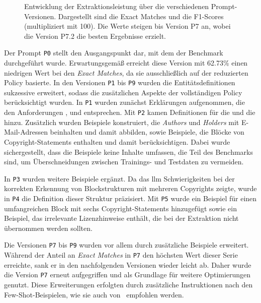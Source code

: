 \begin{figure}[ht]
    \centering
    \caption{Entwicklung der Extraktionsleistung über die verschiedenen Prompt-Versionen. Dargestellt sind die Exact Matches und die F1-Scores (multipliziert mit 100). Die Werte steigen bis Version P7 an, wobei die Version P7.2 die besten Ergebnisse erzielt.}
    \label{fig:prompt-engineering-results}
\end{figure}

Der Prompt \texttt{P0} stellt den Ausgangspunkt dar, mit dem der Benchmark durchgeführt wurde.
Erwartungsgemäß erreicht diese Version mit \num{62.73}\% einen niedrigen Wert bei den \textit{Exact Matches}, da sie ausschließlich auf der reduzierten Policy basierte.
In den Versionen \texttt{P1} bis \texttt{P9} wurden die Entitätsdefinitionen sukzessive erweitert, sodass die zusätzlichen Aspekte der vollständigen Policy berücksichtigt wurden.
In \texttt{P1} wurden zunächst Erklärungen aufgenommen, die den Anforderungen ,  und  entsprechen.
Mit \texttt{P2} kamen Definitionen für die  und die  hinzu.
Zusätzlich wurden Beispiele konstruiert, die \textit{Authors} und \textit{Holders} mit E-Mail-Adressen beinhalten und damit  abbilden, sowie Beispiele, die Blöcke von Copyright-Statements enthalten und damit  berücksichtigen.
Dabei wurde sichergestellt, dass die Beispiele keine Inhalte umfassen, die Teil des Benchmarks sind, um Überschneidungen zwischen Trainings- und Testdaten zu vermeiden.

In \texttt{P3} wurden weitere Beispiele ergänzt.
Da das \gls{llm} Schwierigkeiten bei der korrekten Erkennung von Blockstrukturen mit mehreren Copyrights zeigte, wurde in \texttt{P4} die Definition dieser Struktur präzisiert.
Mit \texttt{P5} wurde ein Beispiel für einen umfangreichen Block mit sechs Copyright-Statements hinzugefügt sowie ein Beispiel, das irrelevante Lizenzhinweise enthält, die bei der Extraktion nicht übernommen werden sollten.

Die Versionen \texttt{P7} bis \texttt{P9} wurden vor allem durch zusätzliche Beispiele erweitert.
Während der Anteil an \textit{Exact Matches} in \texttt{P7} den höchsten Wert dieser Serie erreichte, sank er in den nachfolgenden Versionen wieder leicht ab.
Daher wurde die Version \texttt{P7} erneut aufgegriffen und als Grundlage für weitere Optimierungen genutzt.
Diese Erweiterungen erfolgten durch zusätzliche Instruktionen nach den Few-Shot-Beispielen, wie sie auch von \citeauthor{cheng_novel_2024}\ empfohlen werden\autocite{cheng_novel_2024}.


